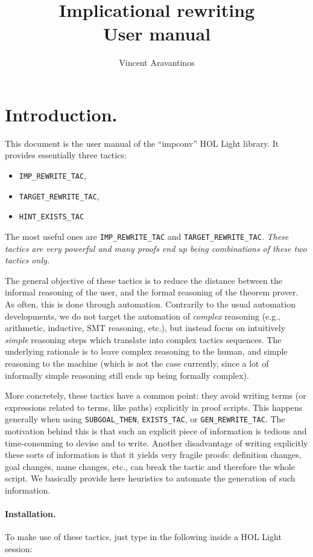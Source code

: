 \documentclass{llncs}
\title{Implicational rewriting\\User manual}
\author{Vincent Aravantinos}
\institute{
  \url{vincent.aravantinos@fortiss.org}\\
  Analysis and Design of Dependable Systems, fortiss GmbH, Munich, Germany\footnote{%
formerly: Hardware Verification Group, Concordia University, Montreal, Canada}}
\newcommand*\IMPREWRITETAC{\texttt{IMP\_REWRITE\_TAC}\xspace}
\newcommand*\GENTAC{\texttt{GEN\_REWRITE\_TAC}\xspace}
\newcommand*\SUBGOAL{\texttt{SUBGOAL\_THEN}\xspace}
\newcommand*\TARGETTAC{\texttt{TARGET\_REWRITE\_TAC}\xspace}
\newcommand*\HINTTAC{\texttt{HINT\_EXISTS\_TAC}\xspace}
\newcommand*\EXISTS{\texttt{EXISTS\_TAC}\xspace}
\begin{document}
  \maketitle

  \section{Introduction.}
		This document is the user manual of the ``impconv'' HOL Light library.
    It provides essentially three tactics:
    \begin{itemize}
      \item \IMPREWRITETAC,
      \item \TARGETTAC,
      \item \HINTTAC
    \end{itemize}
    The most useful ones are \IMPREWRITETAC and \TARGETTAC.
    \emph{These tactics are very powerful and many proofs end up being combinations of these two tactics only.}

    The general objective of these tactics is to reduce the distance between the informal reasoning
    of the user, and the formal reasoning of the theorem prover.
    As often, this is done through automation.
    Contrarily to the usual automation developments, we do not target the automation of \emph{complex} reasoning
    (e.g., arithmetic, inductive, SMT reasoning, etc.),
    but instead focus on intuitively \emph{simple} reasoning steps which
    translate into complex tactics sequences.
    The underlying rationale is to leave complex reasoning to the human,
    and simple reasoning to the machine (which is not the case currently, since a lot of informally simple
    reasoning still ends up being formally complex).
   
    More concretely, these tactics have a common point: they avoid writing terms 
    (or expressions related to terms, like paths) explicitly in proof scripts.
    This happens generally when using \SUBGOAL, \EXISTS, or \GENTAC.
    The motivation behind this is that such an explicit piece of information
    is tedious and time-consuming to devise and to write.
    Another disadvantage of writing explicitly these sorts of information is that it yields very fragile proofs:
    definition changes, goal changes, name changes, etc., can break the tactic and therefore the whole script.
    We basically provide here heuristics to automate the generation of such information.

  \paragraph{Installation.}
    To make use of these tactics, just type in the following inside a HOL Light session:
\end{document}
